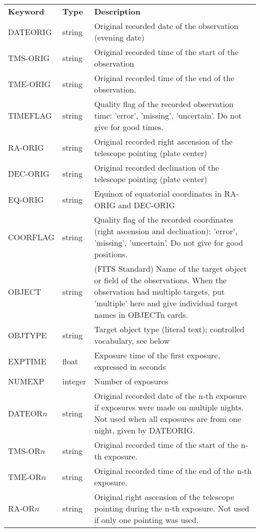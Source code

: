 \documentclass[11pt]{ivoa}
\begin{document}
\begingroup
\footnotesize
\begin{longtable}{llp{}}
\sptablerule
\textbf{Keyword}&
\textbf{Type}&\textbf{Description}\\
\sptablerule
\endhead
DATEORIG  &string  &
  Original recorded date of the observation (evening date)\\
TMS-ORIG  &string  &
  Original recorded time of the start of the observation\\
TME-ORIG  &string  &
  Original recorded time of the end of the observation.\\
TIMEFLAG  &string  &
  Quality flag of the recorded observation time: 'error', 'missing',
  'uncertain'.  Do not give for good times.\\
RA-ORIG   &string  &
  Original recorded right ascension of the telescope pointing (plate center)\\
DEC-ORIG  &string  &
  Original recorded declination of the telescope pointing (plate center)\\
EQ-ORIG   &string  &
  Equinox of equatorial coordinates in RA-ORIG and DEC-ORIG\\
COORFLAG  &string  &
  Quality flag of the recorded coordinates (right ascension and
  declination): 'error', 'missing', 'uncertain'.  Do not give for good
  positions.\\
OBJECT    &string &
  (FITS Standard) Name of the target object or field of the
  observations.  When the observation had multiple targets, put
  'multiple' here and give
  individual target names in OBJECTn cards.\\
OBJTYPE   &string  &
  Target object type (literal text); controlled vocabulary, see below\\
EXPTIME   &float   &
  Exposure time of the first exposure, expressed in seconds\\
NUMEXP    &integer &Number of exposures\\
DATEOR$n$ &string  &
  Original recorded date of the n-th exposure if exposures
  were made on multiple nights. Not used when all exposures are from
  one night, given by DATEORIG.\\
TMS-OR$n$ &string  &
  Original recorded time of the start of the n-th exposure.\\
TME-OR$n$ &string  &
  Original recorded time of the end of the n-th exposure.\\
RA-OR$n$  &string  &
  Original right ascension of the telescope pointing during the n-th
  exposure. Not used if only one pointing was used.\\

\end{longtable}
\end{document}

